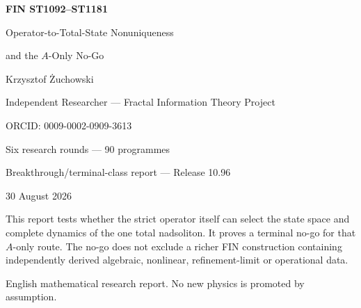\documentclass[11pt,a4paper]{article}
\begin{document}
\begin{titlepage}\centering
\vspace*{15mm}
{\Huge\bfseries FIN ST1092--ST1181\par}\vspace{5mm}
{\LARGE Operator-to-Total-State Nonuniqueness\par}\vspace{2mm}
{\LARGE and the $A$-Only No-Go\par}\vspace{13mm}
{\Large Krzysztof \.Zuchowski\par}
{\normalsize Independent Researcher --- Fractal Information Theory Project\par}
{\normalsize ORCID: 0009-0002-0909-3613\par}\vspace{10mm}
{\large Six research rounds --- 90 programmes\par}
{\large Breakthrough/terminal-class report --- Release 10.96\par}
{\large 30 August 2026\par}
\vfill
\begin{minipage}{.87\textwidth}\small
This report tests whether the strict operator itself can select the state space
and complete dynamics of the one total nadsoliton.  It proves a terminal no-go
for that $A$-only route.  The no-go does not exclude a richer FIN construction
containing independently derived algebraic, nonlinear, refinement-limit or
operational data.
\end{minipage}
\vfill
{\small English mathematical research report.  No new physics is promoted by assumption.}
\end{titlepage}
\end{document}
